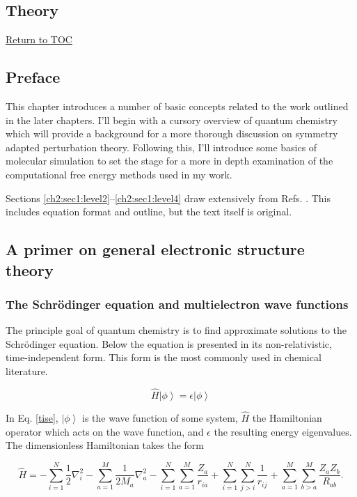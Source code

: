 \begin{theory}
 \chapter{Theory}
 \hyperlink{toc}{Return to TOC}
 \section{\label{ch2:sec0:level1}Preface}
  This chapter introduces a number of basic concepts related to the work outlined in the later chapters.
  I'll begin with a cursory overview of quantum chemistry which will provide a background for a more
  thorough discussion on symmetry adapted perturbation theory. Following this, I'll introduce some basics
  of molecular simulation to set the stage for a more in depth examination of the computational free energy
  methods used in my work.
  
  Sections \ref{ch2:sec1:level2}--\ref{ch2:sec1:level4} draw extensively from Refs. \cite{eschrig1996dft,ostlund}.
  This includes equation format and outline, but the text itself is original.
  
 \section{\label{ch2:sec1:level1}A primer on general electronic structure theory}
  \subsection{\label{ch2:sec1:level2}The Schr\"{o}dinger equation and multielectron wave functions}
   The principle goal of quantum chemistry is to find approximate solutions to the Schr\"{o}dinger equation.
   Below the equation is presented in its non-relativistic, time-independent form. This form is the most 
   commonly used in chemical literature.
 
   \begin{equation}\label{tise}
    \hat{H}\left|\phi\right> = \epsilon\left|\phi\right>
   \end{equation}
 
   In Eq. \ref{tise}, $\left|\phi\right>$ is the wave function of some system, $\hat{H}$ the Hamiltonian 
   operator which acts on the wave function, and $\epsilon$ the resulting energy eigenvalues. The 
   dimensionless Hamiltonian takes the form
 
   \begin{equation}\label{hamiltonian}
    \hat{H} = -\sum_{i=1}^{N} \frac{1}{2}\nabla_{i}^{2} -\sum_{a=1}^{M} \frac{1}{2M_{a}}\nabla_{a}^{2}
              -\sum_{i=1}^{N} \sum_{a=1}^{M} \frac{Z_{a}}{r_{ia}} +\sum_{i=1}^{N} \sum_{j>i}^{N} \frac{1}{r_{ij}}
              +\sum_{a=1}^{M} \sum_{b>a}^{M} \frac{Z_{a}Z_{b}}{R_{ab}}.
   \end{equation}
 

\end{theory}
